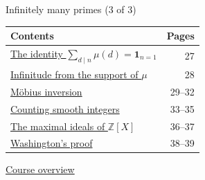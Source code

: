 \documentclass[aspectratio=169,11pt]{beamer}
\newcommand{\Z}{\mathbb Z}
\newcommand{\ind}{\mathbf1}
\begin{document}
\begin{frame}{Infinitely many primes (3 of 3)}
\small\renewcommand{\arraystretch}{1.35}
\begin{tabular}{p{}r}\textbf{Contents}&\textbf{Pages}\\\midrule
\hyperlink{Navigation27}{The identity $\sum_{d\mid n}\mu(d)=\ind_{n=1}$}&27\\
\hyperlink{Navigation28}{Infinitude from the support of $\mu$}&28\\
\hyperlink{Navigation29}{M\"obius inversion}&29--32\\
\hyperlink{Navigation33}{Counting smooth integers}&33--35\\
\hyperlink{Navigation36}{The maximal ideals of $\Z[X]$}&36--37\\
\hyperlink{Navigation38}{Washington's proof}&38--39\\
\end{tabular}\par\medskip\hyperlink{overview}{\color{teal}Course overview}\end{frame}
\end{document}
